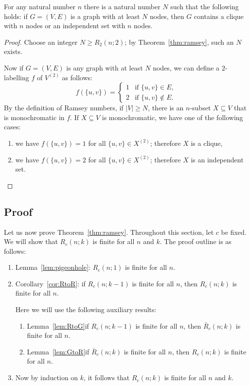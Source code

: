 \begin{lemma}
    For any natural number $n$ there is a natural number $N$ such that the following holds:
    if $G = (V,E)$ is a graph with at least $N$ nodes,
    then $G$ contains a clique with $n$ nodes or an independent set with $n$ nodes.
\end{lemma}
\begin{proof}
    Choose an integer $N \ge R_2(n;2)$; by Theorem~\ref{thm:ramsey}, such an $N$ exists.
    
    Now if $G = (V,E)$ is any graph with at least $N$ nodes, we can define a $2$-labelling $f$ of $V^{(2)}$ as follows:
    \[
        f(\{u,v\}) = \begin{cases}
            1 & \text{if } \{u,v\} \in E, \\
            2 & \text{if } \{u,v\} \notin E.
        \end{cases}
    \]
    By the definition of Ramsey numbers, if $|V| \ge N$, there is an $n$-subset $X \subseteq V$ that is monochromatic in $f$.
    If $X \subseteq V$ is monochromatic, we have one of the following cases:
    \begin{enumerate}
        \item we have $f(\{u,v\}) = 1$ for all $\{u,v\} \in X^{(2)}$; therefore $X$ is a clique,
        \item we have $f(\{u,v\}) = 2$ for all $\{u,v\} \in X^{(2)}$; therefore $X$ is an independent set. \qedhere
    \end{enumerate}
\end{proof}


\subsection{Proof}\label{ssec:ramsey-proof}

Let us now prove Theorem~\ref{thm:ramsey}. Throughout this section, let $c$ be fixed. We will show that $R_c(n;k)$ is finite for all $n$ and $k$. The proof outline is as follows:
\begin{enumerate}
    \item Lemma~\ref{lem:pigeonhole}: $R_c(n;1)$ is finite for all $n$.
    \item Corollary~\ref{cor:RtoR}: if $R_c(n;k-1)$ is finite for all $n$, then $R_c(n;k)$ is finite for all $n$.
    
        Here we will use the following auxiliary results:
        \begin{enumerate}[label=(\roman*)]
            \item Lemma~\ref{lem:RtoG}\mydash if $R_c(n;k-1)$ is finite for all $n$, then $\bar{R}_c(n;k)$ is finite for all $n$.
            \item Lemma~\ref{lem:GtoR}\mydash if $\bar{R}_c(n;k)$ is finite for all $n$, then $R_c(n;k)$ is finite for all $n$.
        \end{enumerate}
    \item Now by induction on $k$, it follows that $R_c(n;k)$ is finite for all $n$ and $k$.
\end{enumerate}

